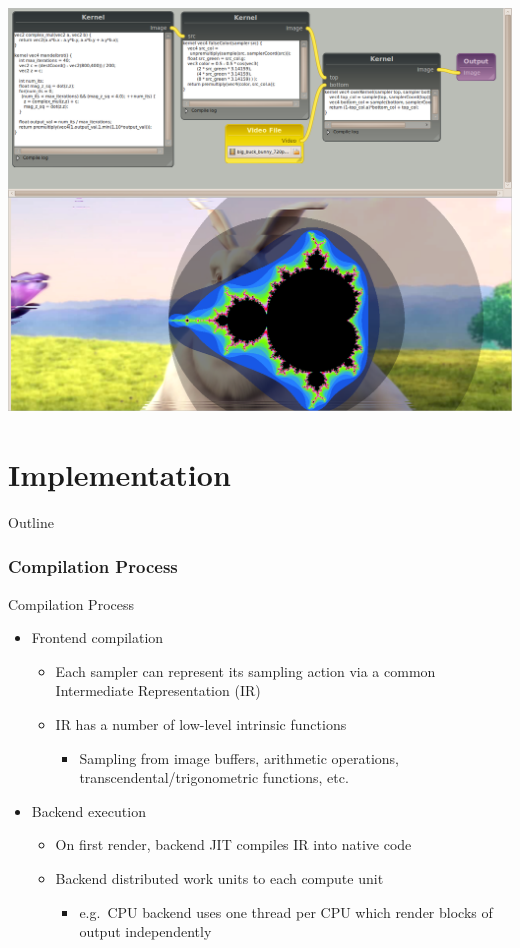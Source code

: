 \documentclass{beamer}
\newcommand{\fancypart}[1]{%
  \part{#1}
  \begin{frame}
    \partpage
  \end{frame}
  \begin{frame}{Outline}
    \tableofcontents
  \end{frame}
}
\newcommand{\bi}{\begin{itemize}}
\newcommand{\ei}{\end{itemize}}
\begin{document}
\begin{frame}
  \includegraphics[width=\textwidth]{firtree-pipeline-image}
\end{frame}


\fancypart{Implementation}

\section{Compilation Process} %

\begin{frame}{Compilation Process}
  \bi
    \item Frontend compilation
    \bi
      \item Each sampler can represent its sampling action via a common
      Intermediate Representation (IR)
      \item IR has a number of low-level intrinsic functions
      \bi
        \item Sampling from image buffers, arithmetic operations,
        transcendental/trigonometric functions, etc.
      \ei
    \ei
    \item Backend execution
    \bi
      \item On first render, backend JIT compiles IR into native code
      \item Backend distributed work units to each compute unit
      \bi
        \item e.g.~CPU backend uses one thread per CPU which render blocks of
        output independently
      \ei
    \ei
  \ei
\end{frame}
\end{document}
